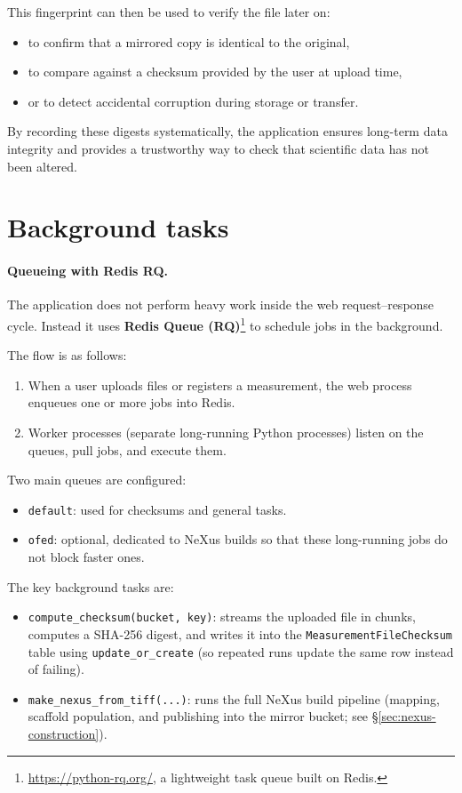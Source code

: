 This fingerprint can then be used to verify the file later on:
\begin{itemize}
	\item to confirm that a mirrored copy is identical to the original,  
	\item to compare against a checksum provided by the user at upload time,  
	\item or to detect accidental corruption during storage or transfer.  
\end{itemize}

By recording these digests systematically, the application ensures long-term data integrity and 
provides a trustworthy way to check that scientific data has not been altered.



\section{Background tasks}\label{sec:background-tasks}

\paragraph{Queueing with Redis RQ.}
The application does not perform heavy work inside the web request–response cycle.  
Instead it uses \textbf{Redis Queue (RQ)}\footnote{\url{https://python-rq.org/}, a lightweight task queue built on Redis.} 
to schedule jobs in the background.  

The flow is as follows:  
\begin{enumerate}
	\item When a user uploads files or registers a measurement, the web process enqueues one or more jobs into Redis.  
	\item Worker processes (separate long-running Python processes) listen on the queues, pull jobs, and execute them.  
\end{enumerate}

Two main queues are configured:  
\begin{itemize}
	\item \texttt{default}: used for checksums and general tasks.  
	\item \texttt{ofed}: optional, dedicated to NeXus builds so that these long-running jobs do not block faster ones.  
\end{itemize}

The key background tasks are:  
\begin{itemize}
	\item \texttt{compute\_checksum(bucket, key)}: streams the uploaded file in chunks, computes a SHA-256 digest, 
	and writes it into the \texttt{MeasurementFileChecksum} table using \texttt{update\_or\_create} 
	(so repeated runs update the same row instead of failing).  
	\item \texttt{make\_nexus\_from\_tiff(...)}: runs the full NeXus build pipeline 
	(mapping, scaffold population, and publishing into the mirror bucket; see \S\ref{sec:nexus-construction}).  
\end{itemize}

